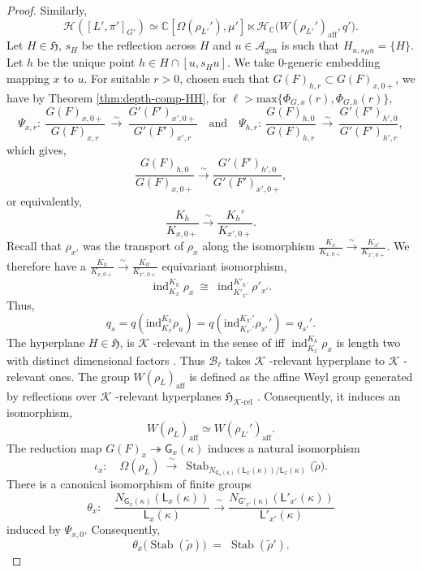 \documentclass[american]{article}
\numberwithin{equation}{section}
\numberwithin{figure}{section}
\theoremstyle{plain}
\theoremstyle{definition}
\theoremstyle{remark}
\DeclareMathOperator{\Stab}{Stab}
\begin{document}
\begin{proof}
Similarly, \[
\mathcal{H}([L', \pi']_{G'}) \simeq 
\mathbb{C}[\Omega(\rho_{L'}'), \mu'] \ltimes 
\mathcal{H}_{\mathbb{C}}\bigl(W(\rho_{L'}')_{\text{aff}}, q'\bigr).
\]
 Let $H\in\mathfrak H$,  $s_H$ be the reflection across \(H\) and $u\in\mathcal{A}_{\mathrm{gen}}$ is such that $H_{u,s_Hu}=\{H\}$. Let $h$ be the unique point $h\in H\cap [u,s_Hu]$. We take $0$-generic embedding mapping $x$ to $u$. For suitable  $r>0$, chosen such that $G(F)_{h,r}\subset G(F)_{x,0+}$, we have by Theorem \ref{thm:depth-comp-HH}, for $\ell >\mathrm{max}\{\Phi_{G,x}(r),\Phi_{G,h}(r)\}$,
$$
\Psi_{x,r}:\ \frac{G(F)_{x,0+}}{G(F)_{x,r}}\ \xrightarrow{\sim}\ \frac{G'(F')_{x',0+}}{G'(F')_{x',r}}
\quad\text{and}\quad
\Psi_{h,r}:\ \frac{G(F)_{h,0}}{G(F)_{h,r}}\ \xrightarrow{\sim}\ \frac{G'(F')_{h',0}}{G'(F')_{h',r}},
$$
which gives, 
\[
\frac{G(F)_{h,0}}{G(F)_{x,0+}}\xrightarrow{\sim}\frac{G'(F')_{h',0}}{G'(F')_{x',0+}}, 
\]
or equivalently, 
\[
\frac{K_h}{K_{x,0+}}\xrightarrow{\sim}\frac{K_h'}{K_{x',0+}}.
\]
Recall that \(\rho_{x'}\) was the transport of \(\rho_x\) along the isomorphism \(\frac{K_x}{K_{x,0+}}\xrightarrow{\sim}\frac{K_{x'}}{K_{x',0+}}\). We therefore have a \(\frac{K_h}{K_{x,0+}}\xrightarrow{\sim}\frac{K_{h'}}{K_{x',0+}}\) equivariant isomorphism,
\[ \tag{I}
\operatorname{ind}^{K_h}_{K_x}\rho_x \ \cong\ \operatorname{ind}^{K'_{h'}}_{K'_{x'}}\rho'_{x'}.
\]
Thus, 
\[
q_s = q(\text{ind}_{K_x}^{K_h} \rho_u) = q(\text{ind}_{K_{x'}'}^{K_{h'}'} \rho_{x'}') = q_{s'}'.
\]
The hyperplane $H\in\mathfrak H$, is $\mathcal{K}$ -relevant in the sense of \cite[Definition 3.5.6]{AFMO24a} iff \(\operatorname{ind}^{K_h}_{K_x}\rho_x \) is length two with distinct dimensional factors \cite[Lemma 4.2.4]{ohara2025}. Thus \(\mathscr{B}_{\ell}\) takes  $\mathcal{K}$ -relevant hyperplane to  $\mathcal{K}$ -relevant ones. The group \(W(\rho_L)_{\text{aff}}\) is defined as the affine Weyl group generated by reflections over  $\mathcal{K}$ -relevant hyperplanes \(\mathfrak{H}_{\mathcal{K}\text{-rel}}\) \cite[Prop. 5.3.5]{AFMO24a}. Consequently, it induces an isomorphism,
\[
W(\rho_L)_{\text{aff}} \simeq W(\rho_{L'}')_{\text{aff}}.
\]
The reduction map $G(F)_x \twoheadrightarrow \mathsf{G}_x(\kappa)$ induces a natural isomorphism
\[
  \iota_x:\quad
  \Omega(\rho_L)\ \xrightarrow{\ \sim\ }\ 
  \Stab_{N_{\mathsf G_x(\kappa)}(\mathsf L_x(\kappa))/\mathsf L_x(\kappa)}\!\big(\widetilde{\rho}\big).
\]
There is a canonical isomorphism of finite groups
\[
  \theta_x:\quad
  \dfrac{N_{\mathsf G_x(\kappa)}(\mathsf L_x(\kappa))}{\mathsf L_x(\kappa)}
  \xrightarrow{\ \sim\ }
  \dfrac{N_{\mathsf G'_{x'}(\kappa)}(\mathsf L'_{x'}(\kappa))}{\mathsf L'_{x'}(\kappa)}
\]
induced by \(\Psi_{x,0}\). Consequently,
\[
  \theta_x\Big(\Stab(\widetilde{\rho})\Big) \;=\; \Stab(\widetilde{\rho}').
\]


\end{proof}
\end{document}
